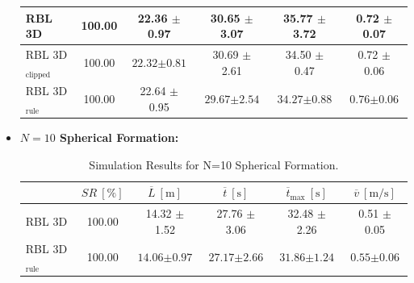 \begin{itemize}
\begin{table}[H]
\begin{tabular}{|l|c|c|c|c|c|}
                RBL 3D                      & 100.00          & 22.36 $\pm$ 0.97                  & 30.65 $\pm$ 3.07                  & 35.77 $\pm$ 3.72                               & 0.72 $\pm$ 0.07                         \\ \hline
                RBL 3D\(_{\text{clipped}}\) & 100.00          & $\mathbf{22.32} \boldsymbol{\pm} \mathbf{0.81}$                  & 30.69 $\pm$ 2.61                  & 34.50 $\pm$ 0.47                               & 0.72 $\pm$ 0.06                         \\ \hline
                RBL 3D\(_{\text{rule}}\)                & 100.00          & 22.64 $\pm$ 0.95                  & $\mathbf{29.67} \boldsymbol{\pm} \mathbf{2.54}$                  & $\mathbf{34.27} \boldsymbol{\pm} \mathbf{0.88}$                               & $\mathbf{0.76} \boldsymbol{\pm} \mathbf{0.06}$                         \\ \hline
                \end{tabular}
            \end{table}
        \item \textbf{$N = 10$ Spherical Formation:}
            \begin{table}[H]
                \caption{Simulation Results for N=10 Spherical Formation.}
                \label{n_10_sph}
                \centering
                \renewcommand{\arraystretch}{1.2}
                \begin{tabular}{|l|c|c|c|c|c|}
                \hline
                                            & \( SR \ [\%] \) & \( \overline{L} \ [\mathrm{m}] \) & \( \overline{t} \ [\mathrm{s}] \) & \( \overline{t}_{\text{max}} \ [\mathrm{s}] \) & \( \overline{v} \ [\mathrm{m/s}] \)     \\ \hline
                RBL 3D                      & 100.00          & 14.32 $\pm$ 1.52                  & 27.76 $\pm$ 3.06                  & 32.48 $\pm$ 2.26                               & 0.51 $\pm$ 0.05                         \\ \hline
                RBL 3D\(_{\text{rule}}\)                & 100.00          & $\mathbf{14.06} \boldsymbol{\pm} \mathbf{0.97}$                  & $\mathbf{27.17} \boldsymbol{\pm} \mathbf{2.66}$                  & $\mathbf{31.86} \boldsymbol{\pm} \mathbf{1.24}$                               & $\mathbf{0.55} \boldsymbol{\pm} \mathbf{0.06}$                         \\ \hline
                \end{tabular}
            \end{table}
    \end{itemize}

